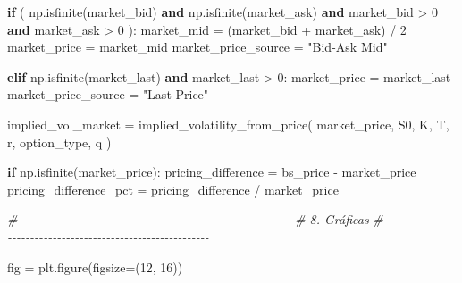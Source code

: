 \documentclass[
  11pt,
]{article}
\newenvironment{Shaded}{}{}
\newcommand{\CommentTok}[1]{\textcolor[rgb]{0.38,0.63,0.69}{\textit{#1}}}
\newcommand{\ControlFlowTok}[1]{\textcolor[rgb]{0.00,0.44,0.13}{\textbf{#1}}}
\newcommand{\DecValTok}[1]{\textcolor[rgb]{0.25,0.63,0.44}{#1}}
\newcommand{\KeywordTok}[1]{\textcolor[rgb]{0.00,0.44,0.13}{\textbf{#1}}}
\newcommand{\NormalTok}[1]{#1}
\newcommand{\OperatorTok}[1]{\textcolor[rgb]{0.40,0.40,0.40}{#1}}
\newcommand{\StringTok}[1]{\textcolor[rgb]{0.25,0.44,0.63}{#1}}
\begin{document}
\begin{Shaded}
\begin{Highlighting}[]
    \ControlFlowTok{if}\NormalTok{ (}
\NormalTok{        np.isfinite(market\_bid)}
        \KeywordTok{and}\NormalTok{ np.isfinite(market\_ask)}
        \KeywordTok{and}\NormalTok{ market\_bid }\OperatorTok{\textgreater{}} \DecValTok{0}
        \KeywordTok{and}\NormalTok{ market\_ask }\OperatorTok{\textgreater{}} \DecValTok{0}
\NormalTok{    ):}
\NormalTok{        market\_mid }\OperatorTok{=}\NormalTok{ (market\_bid }\OperatorTok{+}\NormalTok{ market\_ask) }\OperatorTok{/} \DecValTok{2}
\NormalTok{        market\_price }\OperatorTok{=}\NormalTok{ market\_mid}
\NormalTok{        market\_price\_source }\OperatorTok{=} \StringTok{"Bid{-}Ask Mid"}

    \ControlFlowTok{elif}\NormalTok{ np.isfinite(market\_last) }\KeywordTok{and}\NormalTok{ market\_last }\OperatorTok{\textgreater{}} \DecValTok{0}\NormalTok{:}
\NormalTok{        market\_price }\OperatorTok{=}\NormalTok{ market\_last}
\NormalTok{        market\_price\_source }\OperatorTok{=} \StringTok{"Last Price"}

\NormalTok{    implied\_vol\_market }\OperatorTok{=}\NormalTok{ implied\_volatility\_from\_price(}
\NormalTok{        market\_price, S0, K, T, r, option\_type, q}
\NormalTok{    )}

    \ControlFlowTok{if}\NormalTok{ np.isfinite(market\_price):}
\NormalTok{        pricing\_difference }\OperatorTok{=}\NormalTok{ bs\_price }\OperatorTok{{-}}\NormalTok{ market\_price}
\NormalTok{        pricing\_difference\_pct }\OperatorTok{=}\NormalTok{ pricing\_difference }\OperatorTok{/}\NormalTok{ market\_price}


\CommentTok{\# {-}{-}{-}{-}{-}{-}{-}{-}{-}{-}{-}{-}{-}{-}{-}{-}{-}{-}{-}{-}{-}{-}{-}{-}{-}{-}{-}{-}{-}{-}{-}{-}{-}{-}{-}{-}{-}{-}{-}{-}{-}{-}{-}{-}{-}{-}{-}{-}{-}{-}{-}{-}{-}{-}{-}{-}{-}{-}{-}{-}}
\CommentTok{\# 8. Gráficas}
\CommentTok{\# {-}{-}{-}{-}{-}{-}{-}{-}{-}{-}{-}{-}{-}{-}{-}{-}{-}{-}{-}{-}{-}{-}{-}{-}{-}{-}{-}{-}{-}{-}{-}{-}{-}{-}{-}{-}{-}{-}{-}{-}{-}{-}{-}{-}{-}{-}{-}{-}{-}{-}{-}{-}{-}{-}{-}{-}{-}{-}{-}{-}}

\NormalTok{fig }\OperatorTok{=}\NormalTok{ plt.figure(figsize}\OperatorTok{=}\NormalTok{(}\DecValTok{12}\NormalTok{, }\DecValTok{16}\NormalTok{))}


\end{Highlighting}
\end{Shaded}
\end{document}
